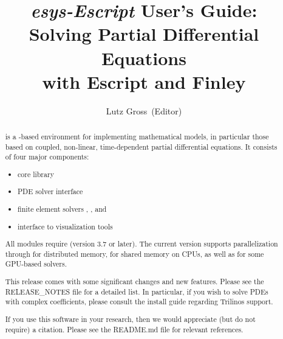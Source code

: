 \documentclass{esysdoc}
\title{\emph{esys-Escript} User's Guide:\\ Solving Partial Differential Equations\\ with Escript and Finley}
\author{Lutz Gross\etal~(Editor)}
\date{\reldate}
\begin{document}
\maketitle

\ifpdf
{}
\fi




\begin{abstract}%
\escript is a \PYTHON-based environment for implementing mathematical models, in particular those based on coupled, non-linear, time-dependent partial differential equations.
It consists of four major components:
\begin{itemize}
\item \escript core library
\item PDE solver interface
\item finite element solvers \finley, \ripley, \speckley and \oxley
\item interface to visualization tools
\end{itemize}

All \escript modules require  (version 3.7 or later).
The current version supports parallelization through \MPI for distributed
memory, \OPENMP for shared memory on CPUs, as well as \CUDA for some GPU-based
solvers.

This release comes with some significant changes and new features.
Please see the RELEASE\_NOTES file for a detailed list.
In particular, if you wish to solve PDEs with complex coefficients, please consult the install guide regarding Trilinos support.

If you use this software in your research, then we would appreciate (but do not
require) a citation.
Please see the README.md file for relevant references.
\end{abstract}

\cleardoublepage{}%
\tableofcontents














\esysappendix %



\cleardoublepage
{}
{}
\printindex

\cleardoublepage
{}
{}


\end{document}
